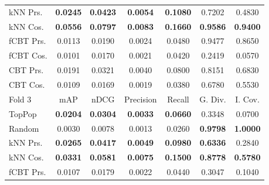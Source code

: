 \begin{table}[hbt]
\begin{tabulary}{\textwidth}{|L|CCCCCC|}
kNN Prs. & \textbf{0.0245} &  \textbf{0.0423} &  \textbf{0.0054} &  \textbf{0.1080} &                                           0.7202 &                                            0.4830 \\
kNN Cos. & \textbf{0.0556} &  \textbf{0.0797} &  \textbf{0.0083} &  \textbf{0.1660} &                                  \textbf{0.9586} &                                   \textbf{0.9400} \\
fCBT Prs. & 0.0113 &           0.0190 &           0.0024 &           0.0480 &                                           0.9477 &                                            0.8650 \\
fCBT Cos. & 0.0101 &           0.0170 &           0.0021 &           0.0420 &                                           0.2419 &                                            0.0570 \\
CBT Prs. & 0.0191 &           0.0321 &           0.0040 &           0.0800 &                                           0.8151 &                                            0.6830 \\
CBT Cos. & 0.0109 &           0.0169 &           0.0019 &           0.0380 &                                           0.6780 &                                            0.5530 \\
\hline
\hline
Fold 3 & mAP & nDCG & Precision & Recall & G. Div. & I. Cov. \\
\hline
TopPop & \textbf{0.0204} &  \textbf{0.0304} &  \textbf{0.0033} &  \textbf{0.0660} &                                           0.3348 &                                            0.0700 \\
Random & 0.0030 &           0.0078 &           0.0013 &           0.0260 &                                  \textbf{0.9798} &                                   \textbf{1.0000} \\
kNN Prs. & \textbf{0.0265} &  \textbf{0.0417} &  \textbf{0.0049} &  \textbf{0.0980} &                                  \textbf{0.6336} &                                            0.2840 \\
kNN Cos. & \textbf{0.0331} &  \textbf{0.0581} &  \textbf{0.0075} &  \textbf{0.1500} &                                  \textbf{0.8778} &                                   \textbf{0.5780} \\
fCBT Prs. & 0.0107 &           0.0179 &           0.0022 &           0.0440 &                                           0.3047 &                                            0.1040 \\

\end{tabulary}
\end{table}
